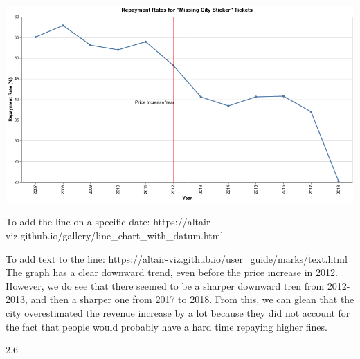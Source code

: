 \documentclass[
  letterpaper,
  DIV=11,
  numbers=noendperiod]{scrartcl}
\begin{document}
\includegraphics{ps2_final_files/figure-pdf/cell-17-output-1.png}

To add the line on a specific date:
https://altair-viz.github.io/gallery/line\_chart\_with\_datum.html

To add text to the line:
https://altair-viz.github.io/user\_guide/marks/text.html The graph has a
clear downward trend, even before the price increase in 2012. However,
we do see that there seemed to be a sharper downward tren from
2012-2013, and then a sharper one from 2017 to 2018. From this, we can
glean that the city overestimated the revenue increase by a lot because
they did not account for the fact that people would probably have a hard
time repaying higher fines.

2.6
\end{document}
